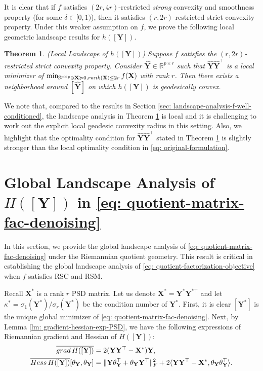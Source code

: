 \documentclass[11pt]{article}
\newtheorem{Theorem}{Theorem}
\newcommand{\bbR}{\mathbb{R}}
\newcommand{\bbS}{\mathbb{S}}
\newcommand{\0}{{\mathbf{0}}}
\newcommand{\1}{{\mathbf{1}}}
\newcommand{\X}{{\mathbf{X}}}
\newcommand{\Y}{{\mathbf{Y}}}
\newcommand{\rank}{{\rm rank}}
\newcommand{\Hess}{{\rm Hess}}
\newcommand{\grad}{{\rm grad}}
\newcommand{\F}{{\rm F}}
\newcommand{\nc}{\normalcolor}
\begin{document}
It is clear that if $f$ satisfies $(2r,4r)$-restricted \textit{strong} convexity and smoothness property (for some $\delta \in [0,1)$), then it satisfies $(r, 2r)$-restricted strict convexity property. Under this weaker assumption on $f$, we prove the following local geometric landscape results for $h([\Y])$. \nc
\begin{Theorem}(Local Landscape of $h([\Y])$) \label{th: local-landscape-f-convex} Suppose $f$ satisfies the $(r,2r)$-restricted strict convexity property. Consider $\widehat{\Y} \in \bbR^{p \times r}$ such that $\widehat{\Y} \widehat{\Y}^\top$ is a local minimizer of $\min_{ \bbS^{p \times p} \ni \X \succcurlyeq 0, \rank(\X) \leq 2r  } f(\X)$ with rank $r$. Then there exists a neighborhood around $[\widehat{\Y}]$ on which $h([\Y])$ is geodesically convex.
\end{Theorem}

We note that, compared to the results in Section \ref{sec: landscape-analysis-f-well-conditioned}, the landscape analysis in Theorem \ref{th: local-landscape-f-convex} is local and it is challenging to work out the explicit local geodesic convexity radius in this setting. {Also, we highlight that the optimality condition for $\widehat{\Y} \widehat{\Y}^\top$ stated in Theorem \ref{th: local-landscape-f-convex} is slightly stronger than the local optimality condition in \eqref{eq: original-formulation}. }


\section{Global Landscape Analysis of $H([\Y])$ in \eqref{eq: quotient-matrix-fac-denoising}} \label{sec: H-landscape-analysis}
In this section, we provide the global landscape analysis of \eqref{eq: quotient-matrix-fac-denoising} under the Riemannian quotient geometry. This result is critical in establishing the global landscape analysis of \eqref{eq: quotient-factorization-objective} when $f$ satisfies RSC and RSM.

Recall $\X^*$ is a rank $r$ PSD matrix. Let us denote $\X^* = \Y^* \Y^{*\top}$ and let $\kappa^* = \sigma_1(\Y^*)/\sigma_r(\Y^*)$ be the condition number of $\Y^*$. First, it is clear $[\Y^*]$ is the unique global minimizer of \eqref{eq: quotient-matrix-fac-denoising}. Next, by Lemma \ref{lm: gradient-hessian-exp-PSD}, we have the following expressions of Riemannian gradient and Hessian of $H([\Y])$:
\begin{equation} \label{eq: gradient-Hessian-exp-H}
	\begin{split}
		\overline{\grad\, H([\Y])} &= 2(\Y \Y^\top -\X^*) \Y, \\
			\overline{\Hess \, H([\Y])}[\theta_\Y, \theta_\Y] 
		&=\|\Y\theta_\Y^\top + \theta_\Y \Y^\top \|_\F^2 + 2\langle \Y \Y^\top -\X^*, \theta_\Y \theta_\Y^\top \rangle.
	\end{split}
\end{equation} 
\end{document}
